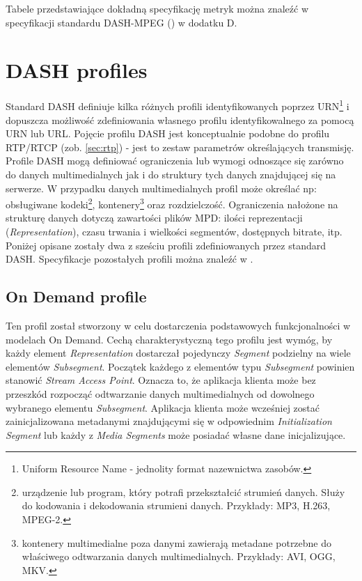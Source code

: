 Tabele przedstawiające dokładną specyfikację metryk można znaleźć w specyfikacji standardu DASH-MPEG (\cite{ISO-IEC-DASH}) w dodatku D.

\section{DASH profiles}
\label{sec:profile}

Standard DASH definiuje kilka różnych profili identyfikowanych poprzez URN\footnote{Uniform Resource Name - jednolity format nazewnictwa zasobów.} i dopuszcza możliwość zdefiniowania własnego profilu identyfikowalnego za pomocą URN lub URL. Pojęcie profilu DASH jest konceptualnie podobne do profilu RTP/RTCP (zob. \ref{sec:rtp}) - jest to zestaw parametrów określających transmisję. Profile DASH mogą definiować ograniczenia lub wymogi odnoszące się zarówno do danych multimedialnych jak i do struktury tych danych znajdującej się na serwerze. W przypadku danych multimedialnych profil może określać np: obsługiwane kodeki\footnote{urządzenie lub program, który potrafi przekształcić strumień danych. Służy do kodowania i dekodowania strumieni danych. Przykłady: MP3, H.263, MPEG-2.}, kontenery\footnote{kontenery multimedialne poza danymi zawierają metadane potrzebne do właściwego odtwarzania danych multimedialnych. Przykłady: AVI, OGG, MKV.} oraz rozdzielczość. Ograniczenia nałożone na strukturę danych dotyczą zawartości plików MPD: ilości reprezentacji (\textit{Representation}), czasu trwania i wielkości segmentów, dostępnych bitrate, itp. Poniżej opisane zostały dwa z sześciu profili zdefiniowanych przez standard DASH. Specyfikacje pozostałych profili można znaleźć w \cite{ISO-IEC-DASH}.

\subsection{On Demand profile}

Ten profil został stworzony w celu dostarczenia podstawowych funkcjonalności w modelach On Demand. Cechą charakterystyczną tego profilu jest wymóg, by każdy element \textit{Representation} dostarczał pojedynczy \textit{Segment} podzielny na wiele elementów \textit{Subsegment}. Początek każdego z elementów typu \textit{Subsegment} powinien stanowić \textit{Stream Access Point}. Oznacza to, że aplikacja klienta może bez przeszkód rozpocząć odtwarzanie danych multimedialnych od dowolnego wybranego elementu \textit{Subsegment}. Aplikacja klienta może wcześniej zostać zainicjalizowana metadanymi znajdującymi się w odpowiednim \textit{Initialization Segment} lub każdy z \textit{Media Segments} może posiadać własne dane inicjalizujące.

